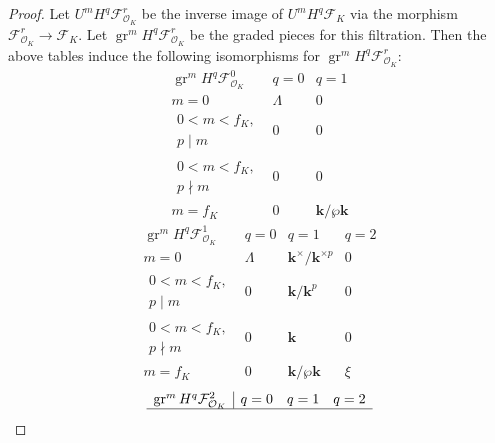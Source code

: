 \documentclass{amsart}
\theoremstyle{remark}
\numberwithin{equation}{subsection}
\newcommand{\Order}{\mathcal{O}}
\newcommand{\alg}[1]{\mathbf{#1}}
\DeclareMathOperator{\gr}{gr}
\begin{document}
\begin{proof}
	Let $U^{m} H^{q} \mathcal{F}_{\Order_{K}}^{r}$ be the inverse image of
	$U^{m} H^{q} \mathcal{F}_{K}$ via the morphism $\mathcal{F}_{\Order_{K}}^{r} \to \mathcal{F}_{K}$.
	Let $\gr^{m} H^{q} \mathcal{F}_{\Order_{K}}^{r}$ be the graded pieces for this filtration.
	Then the above tables induce the following isomorphisms for $\gr^{m} H^{q} \mathcal{F}_{\Order_{K}}^{r}$:
		\[
			\begin{array}{c|cc}
					\gr^{m} H^{q} \mathcal{F}_{\Order_{K}}^{0}
				&
					q = 0
				&
					q = 1
				\\ \hline
					m = 0
				&
					\Lambda
				&
					0
				\\
					\begin{array}{c}
						0 < m < f_{K},\\ p \mid m
					\end{array}
				&
					0
				&
					0
				\\
					\begin{array}{c}
						0 < m < f_{K},\\ p \nmid m
					\end{array}
				&
					0
				&
					0
				\\
					m = f_{K}
				&
					0
				&
					\alg{k} / \wp \alg{k}
			\end{array}
		\]
		\[
			\begin{array}{c|ccc}
					\gr^{m} H^{q} \mathcal{F}_{\Order_{K}}^{1}
				&
					q = 0
				&
					q = 1
				&
					q = 2
				\\ \hline
					m = 0
				&
					\Lambda
				&
					\alg{k}^{\times} / \alg{k}^{\times p}
				&
					0
				\\
					\begin{array}{c}
						0 < m < f_{K},\\ p \mid m
					\end{array}
				&
					0
				&
					\alg{k} / \alg{k}^{p}
				&
					0
				\\
					\begin{array}{c}
						0 < m < f_{K},\\ p \nmid m
					\end{array}
				&
					0
				&
					\alg{k}
				&
					0
				\\
					m = f_{K}
				&
					0
				&
					\alg{k} / \wp \alg{k}
				&
					\xi
			\end{array}
		\]
		\[
			\begin{array}{c|ccc}
					\gr^{m} H^{q} \mathcal{F}_{\Order_{K}}^{2}
				&
					q = 0
				&
					q = 1
				&
					q = 2
				\\ \hline

\end{array}\]
\end{proof}
\end{document}
